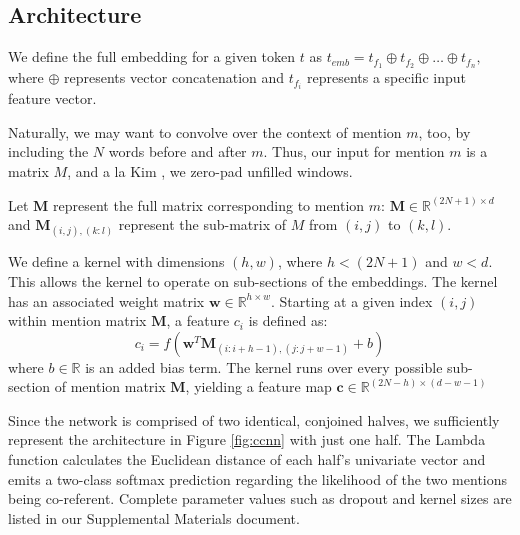 \documentclass[11pt,a4paper]{article}
\begin{document}
\subsection{Architecture}
We define the full embedding for a given token $t$ as $t_{emb} = t_{f_{1}} \oplus t_{f_{2}} \oplus \ldots \oplus t_{f_{n}},$ where $\oplus$ represents vector concatenation and $t_{f_{i}}$ represents a specific input feature vector.

Naturally, we may want to convolve over the context of mention $m$, too, by including the $N$ words before and after $m$.  Thus, our input for mention $m$ is a matrix $M$, and a la Kim , we zero-pad unfilled windows.

\vspace{3mm}

Let $\textbf{M}$ represent the full matrix corresponding to mention $m$: $\textbf{M} \in \mathbb{R}^{(2N+1) \times d}$ and $\textbf{M}_{(i,j),(k:l)}$ represent the sub-matrix of $M$ from $(i,j)$ to $(k,l)$.

\vspace{3mm}

We define a kernel with dimensions $(h,w)$, where $h < (2N+1)$ and $w < d$.  This allows the kernel to operate on sub-sections of the embeddings.  The kernel has an associated weight matrix $\textbf{w} \in \mathbb{R}^{h \times w}$.  Starting at a given index $(i,j)$ within mention matrix $\textbf{M}$, a feature $c_{i}$ is defined as:
\begin{equation}
c_{i} = f(\textbf{w}^{T}\textbf{M}_{(i:i+h-1),(j:j+w-1)} + b)
\end{equation}
where $b \in \mathbb{R}$ is an added bias term.  The kernel runs over every possible sub-section of mention matrix $\textbf{M}$, yielding a feature map $\textbf{c} \in \mathbb{R}^{(2N-h) \times (d-w-1)}$

\vspace{3mm}

Since the network is comprised of two identical, conjoined halves, we sufficiently represent the architecture in Figure \ref{fig:ccnn} with just one half.  The Lambda function calculates the Euclidean distance of each half's univariate vector and emits a two-class softmax prediction regarding the likelihood of the two mentions being co-referent.  Complete parameter values such as dropout and kernel sizes are listed in our Supplemental Materials document.
\end{document}
